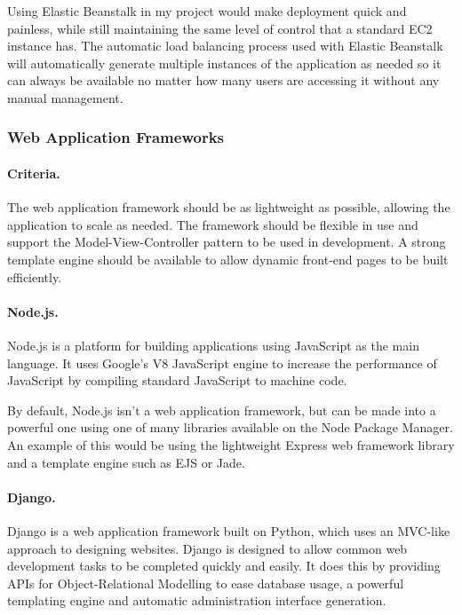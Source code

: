 \documentclass[a4paper, 12pt]{article}
\begin{document}
Using Elastic Beanstalk in my project would make deployment quick and painless, while still maintaining the same level of control that a standard EC2 instance has. The automatic load balancing process used with Elastic Beanstalk will automatically generate multiple instances of the application as needed so it can always be available no matter how many users are accessing it without any manual management.

\subsubsection{Web Application Frameworks}
\paragraph{Criteria.}
The web application framework should be as lightweight as possible, allowing the application to scale as needed. The framework should be flexible in use and support the Model-View-Controller pattern to be used in development. A strong template engine should be available to allow dynamic front-end pages to be built efficiently.

\paragraph{Node.js.}
Node.js is a platform for building applications using JavaScript as the main language. It uses Google's V8 JavaScript engine to increase the performance of JavaScript by compiling standard JavaScript to machine code.\cite{nodejs}

By default, Node.js isn't a web application framework, but can be made into a powerful one using one of many libraries available on the Node Package Manager.\cite{npmjs} An example of this would be using the lightweight Express web framework library and a template engine such as EJS or Jade.

\paragraph{Django.}
Django is a web application framework built on Python, which uses an MVC-like approach to designing websites.\cite{django} Django is designed to allow common web development tasks to be completed quickly and easily. It does this by providing APIs for Object-Relational Modelling to ease database usage, a powerful templating engine and automatic administration interface generation.\cite{djangooverview}
\end{document}
